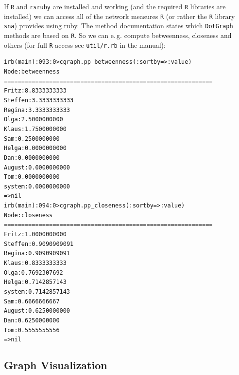 \documentclass[a4paper]{scrartcl}
\newcounter{tcounter}
\newcommand{\tcount}{\makebox[0pt][r]{\tiny\thetcounter~}}
\newenvironment{typed}{\refstepcounter{tcounter}\bgroup\setlength{\topsep}{0pt}\renewcommand{\FrameCommand}[1]{\fcolorbox{black!30}{bgcolor}{##1}\tcount}\MakeFramed{\FrameRestore}\begin{alltt}\small}{\end{alltt}\endMakeFramed\egroup\par\aftergroup\noindent\aftergroup\ignorespaces}
\newcommand{\file}[1]{\texttt{\color{file}#1}}
\newcommand{\code}[1]{\texttt{\color{code}#1}}
\newcommand{\rdoc}[1]{\texttt{\color{help}#1}}
\newcommand{\p}{\textcolor{prompt}}
\renewcommand{\c}{\textcolor{cmd}}
\begin{document}
If \file{R} and \file{rsruby} are installed and working (and the
required \file{R} libraries are installed) we can access all of the
network measures \file{R} (or rather the \file{R} library \file{sna})
provides using ruby. The method documentation states which
\code{DotGraph} methods are based on \file{R}. So we can
e.\,g. compute betweenness, closeness and others (for full
\file{R} access see \rdoc{util/r.rb} in the manual):
\begin{typed}
\p{irb(main):093:0>} \c{cgraph.pp_betweenness(:sortby => :value)}
Node                          :          betweenness
============================================================
Fritz                         :         8.8333333333
Steffen                       :         3.3333333333
Regina                        :         3.3333333333
Olga                          :         2.5000000000
Klaus                         :         1.7500000000
Sam                           :         0.2500000000
Helga                         :         0.0000000000
Dan                           :         0.0000000000
August                        :         0.0000000000
Tom                           :         0.0000000000
system                        :         0.0000000000
=> nil
\p{irb(main):094:0>} \c{cgraph.pp_closeness(:sortby => :value)}
Node                          :            closeness
============================================================
Fritz                         :         1.0000000000
Steffen                       :         0.9090909091
Regina                        :         0.9090909091
Klaus                         :         0.8333333333
Olga                          :         0.7692307692
Helga                         :         0.7142857143
system                        :         0.7142857143
Sam                           :         0.6666666667
August                        :         0.6250000000
Dan                           :         0.6250000000
Tom                           :         0.5555555556
=> nil
\end{typed}

\subsection{Graph Visualization}
\label{sec:gvis}
\end{document}
